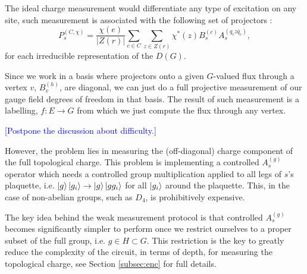 \documentclass[two column]{article}
\newcommand{\caro}[1]{\textcolor{red}{[#1]}}
\newcommand{\jovan}[1]{\textcolor{blue}{[#1]}}
\begin{document}
The ideal charge measurement would differentiate any type of excitation on any site, such measurement is associated with the following set of projectors \cite{}:
\begin{equation}
    P_s^{(C, \chi)} = \frac{\chi(e)}{|Z(r)|}\sum_{c \in C}\sum_{z \in Z(r)}\chi^*(z)B_s^{(c)}A_s^{(q_c z \bar{q}_c)},
\end{equation}
for each irreducible representation of the $D(G)$.

Since we work in a basis where projectors onto a given $G$-valued flux through a vertex $v$, $B_v^{(h)}$, are diagonal, we can just do a full projective measurement of our gauge field degrees of freedom in that basis. 
The result of such measurement is a labelling, $f: E \rightarrow G$ from which we just compute the flux through any vertex. 

\jovan{Postpone the discussion about difficulty.}

However, the problem lies in measuring the (off-diagonal) charge component of the full topological charge.
This problem is implementing a controlled $A^{(g)}_s$ operator which needs a controlled group multiplication applied to all legs of $s$'s plaquette, i.e. $\ket{g}\ket{g_i} \rightarrow \ket{g}\ket{gg_i}$ for all $\ket{g_i}$ around the plaquette.
This, in the case of non-abelian groups, such as $D_4$, is prohibitively expensive. 



The key idea behind the weak measurement protocol is that controlled $A_s^{(g)}$ becomes significantly simpler to perform once we restrict ourselves to a proper subset of the full group, i.e. $g \in H \subset G$.
This restriction is the key to greatly reduce the complexity of the circuit, in terms of depth, for measuring the topological charge,
see Section \ref{subsec:enc} for full details.
\end{document}
